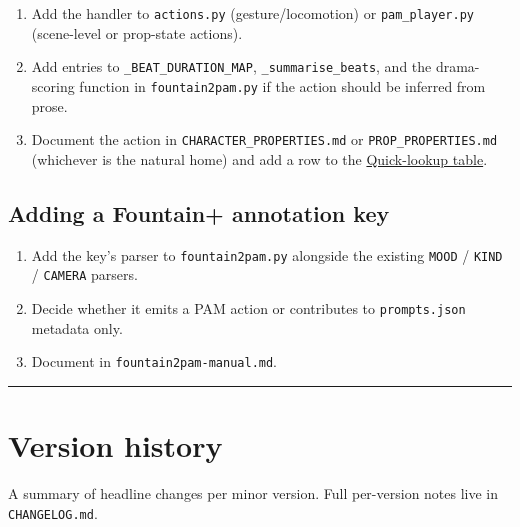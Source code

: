 \documentclass[
  12pt,
  letterpaper,
]{book}
\providecommand{\tightlist}{%
  \setlength{\itemsep}{0pt}\setlength{\parskip}{0pt}}
\begin{document}
\begin{enumerate}
\def\labelenumi{\arabic{enumi}.}
\tightlist
\item
  Add the handler to \texttt{actions.py} (gesture/locomotion) or
  \texttt{pam\_player.py} (scene-level or prop-state actions).
\item
  Add entries to \texttt{\_BEAT\_DURATION\_MAP},
  \texttt{\_summarise\_beats}, and the drama-scoring function in
  \texttt{fountain2pam.py} if the action should be inferred from prose.
\item
  Document the action in \texttt{CHARACTER\_PROPERTIES.md} or
  \texttt{PROP\_PROPERTIES.md} (whichever is the natural home) and add a
  row to the \hyperref[quick-lookup-table]{Quick-lookup table}.
\end{enumerate}

\subsection{Adding a Fountain+ annotation
key}\label{adding-a-fountain-annotation-key}

\begin{enumerate}
\def\labelenumi{\arabic{enumi}.}
\tightlist
\item
  Add the key's parser to \texttt{fountain2pam.py} alongside the
  existing \texttt{MOOD} / \texttt{KIND} / \texttt{CAMERA} parsers.
\item
  Decide whether it emits a PAM action or contributes to
  \texttt{prompts.json} metadata only.
\item
  Document in \texttt{fountain2pam-manual.md}.
\end{enumerate}

\begin{center}\rule{0.5\linewidth}{0.5pt}\end{center}

\section{Version history}\label{version-history}

A summary of headline changes per minor version. Full per-version notes
live in \texttt{CHANGELOG.md}.
\end{document}
